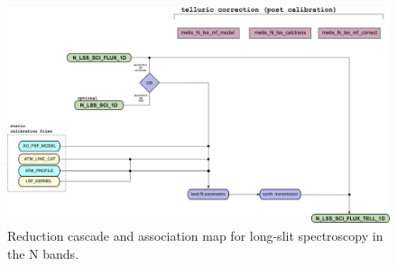 \begin{landscape}
\begin{figure}[ht]
  \centering
  \includegraphics{figures/N_LSS_pipeline_wf_draft_latest_part_2_v0.82.png}
  \caption[Reduction cascade and association map for N long-slit
  spectroscopy]{Reduction cascade and association map for long-slit
    spectroscopy in the N bands. }
  \label{Fig:NLssAssomap2}
\end{figure}
\end{landscape}

